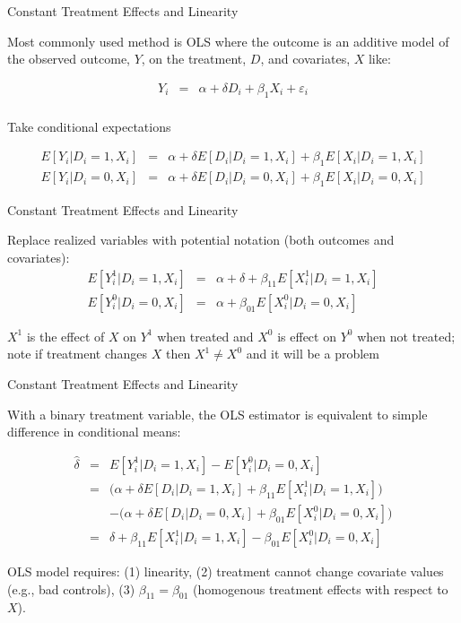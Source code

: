 \documentclass{beamer}
\begin{document}
\begin{frame}{Constant Treatment Effects and Linearity}

Most commonly used method is OLS where the outcome is an additive model of the observed outcome, $Y$, on the treatment, $D$, and covariates, $X$ like:

\begin{eqnarray*}
Y_{i} &=& \alpha + \delta D_i + \beta_1 X_i +  \varepsilon_i \\
\end{eqnarray*}

Take conditional expectations 

\begin{eqnarray*}
E[Y_i | D_i = 1, X_i] &=& \alpha + \delta E[D_i | D_i=1, X_i] + \beta_1 E[X_i | D_i=1, X_i] \\
E[Y_i | D_i = 0, X_i] &=& \alpha + \delta E[D_i | D_i=0, X_i] + \beta_1 E[X_i | D_i=0, X_i] 
\end{eqnarray*}

\end{frame}

\begin{frame}{Constant Treatment Effects and Linearity}

Replace realized variables with potential notation (both outcomes and covariates):
\begin{eqnarray*}
E[Y^1_i | D_i = 1,X_i] &=& \alpha + \delta + \beta_{11} E[X^1_i | D_i=1, X_i] \\
E[Y^0_i | D_i = 0,X_i] &=& \alpha + \beta_{01} E[X^0_i | D_i=0, X_i] 
\end{eqnarray*}

\bigskip

$X^1$ is the effect of $X$ on $Y^1$ when treated and $X^0$ is effect on $Y^0$ when not treated; note if treatment changes $X$ then $X^1 \neq X^0$ and it will be a problem


\end{frame}


\begin{frame}{Constant Treatment Effects and Linearity}

With a binary treatment variable, the OLS estimator is equivalent to simple difference in conditional means:

\begin{eqnarray*}
\widehat{\delta} &=& E[Y^1_i | D_i = 1, X_i]  - E[Y^0_i | D_i = 0, X_i]  \\
 &=& \bigg (\alpha + \delta E[D_i | D_i=1, X_i] + \beta_{11} E[X^1_i | D_i=1, X_i] \bigg ) \\
&& - \bigg (\alpha + \delta E[D_i | D_i = 0, X_i] + \beta_{01} E[X^0_i | D_i = 0, X_i] \bigg ) \\
&=& \delta + \beta_{11} E[X^1_i | D_i =1, X_i] - \beta_{01} E[X^0_i | D_i = 0, X_i] 
\end{eqnarray*}

\bigskip

OLS model requires: (1) linearity, (2)  treatment cannot change covariate values (e.g., bad controls), (3) $\beta_{11}=\beta_{01}$ (homogenous treatment effects with respect to $X$).  

\end{frame}
\end{document}
